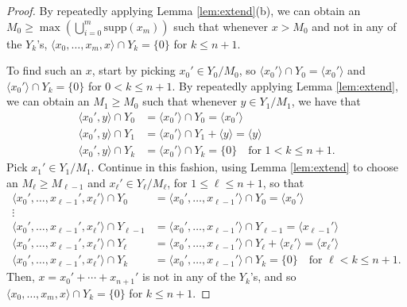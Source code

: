 \documentclass[11pt]{amsart}
\theoremstyle{definition}
\theoremstyle{remark}
\newcommand{\supp}{\mathrm{supp}}
\renewcommand{\1}{\mathbf{1}}
\begin{document}
\begin{proof}
	By repeatedly applying Lemma \ref{lem:extend}(b), we can obtain an $M_0\geq\max(\bigcup_{i=0}^m\supp(x_m))$ such that whenever $x>M_0$ and not in any of the $Y_k$'s, $\langle x_0,\ldots,x_m,x\rangle\cap Y_k=\{0\}$ for $k\leq n+1$.
	
	To find such an $x$, start by picking $x_0'\in Y_0/M_0$, so $\langle x_0'\rangle\cap Y_0=\langle x_0'\rangle$ and $\langle x_0'\rangle\cap Y_k=\{0\}$ for $0<k\leq n+1$. By repeatedly applying Lemma \ref{lem:extend}, we can obtain an $M_1\geq M_0$ such that whenever $y\in Y_1/M_1$, we have that
	\begin{align*}
		\langle x_0',y\rangle\cap Y_0&=\langle x_0'\rangle\cap Y_0=\langle x_0'\rangle\\
		\langle x_0',y\rangle\cap Y_1&=\langle x_0'\rangle \cap Y_1+\langle y\rangle=\langle y\rangle\\
		\langle x_0',y\rangle\cap Y_k&=\langle x_0'\rangle\cap Y_k=\{0\} \quad\text{for $1<k\leq n+1$}.
	\end{align*}
	Pick $x_1'\in Y_1/M_1$. Continue in this fashion, using Lemma \ref{lem:extend} to choose an $M_\ell\geq M_{\ell-1}$ and $x_\ell'\in Y_\ell/M_\ell$, for $1\leq\ell\leq n+1$, so that
	\begin{align*}
		\langle x_0',\ldots,x_{\ell-1}',x_\ell'\rangle\cap Y_0&=\langle x_0',\ldots,x_{\ell-1}'\rangle\cap Y_0=\langle x_0'\rangle\\	
		\vdots \\
		\langle x_0',\ldots,x_{\ell-1}',x_\ell'\rangle\cap Y_{\ell-1}&=\langle x_0',\ldots,x_{\ell-1}'\rangle\cap Y_{\ell-1}=\langle x_{\ell-1}'\rangle\\
		\langle x_0',\ldots,x_{\ell-1}',x_\ell'\rangle\cap Y_\ell &=\langle x_0',\ldots,x_{\ell-1}'\rangle \cap Y_\ell+\langle x_\ell'\rangle =\langle x_\ell'\rangle\\
		\langle x_0',\ldots,x_{\ell-1}',x_\ell'\rangle\cap Y_k&=\langle x_0',\ldots,x_{\ell-1}'\rangle\cap Y_k=\{0\} \quad\text{for $\ell<k\leq n+1$}.
	\end{align*}
	Then, $x=x_0'+\cdots+x_{n+1}'$ is not in any of the $Y_k$'s, and so $\langle x_0,\ldots,x_m,x\rangle\cap Y_k=\{0\}$ for $k\leq n+1$.
\end{proof}
\end{document}
